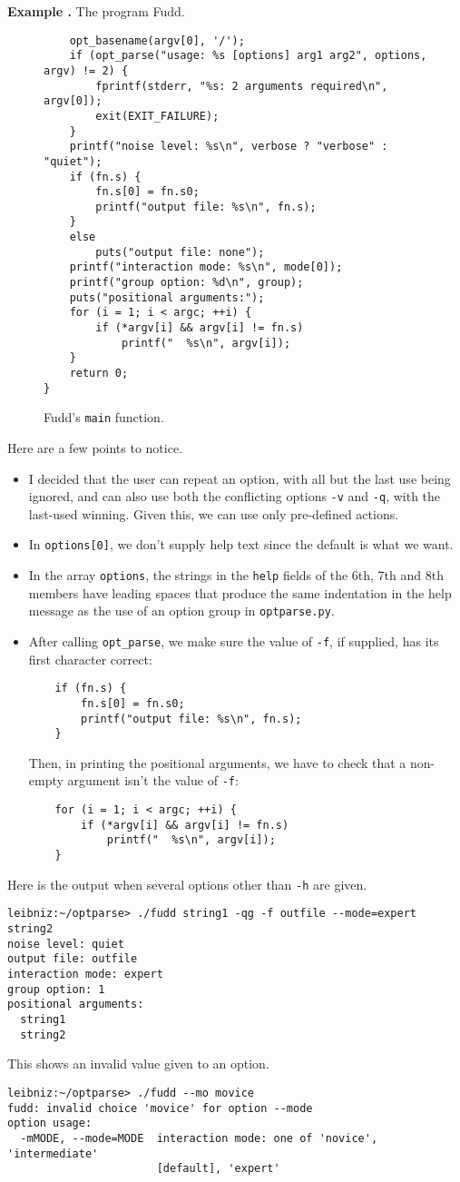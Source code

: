 \documentclass{article}
\newcounter{exnum}
\newenvironment{example}[1]
{\par\smallskip\noindent\refstepcounter{exnum}\textbf{Example
    \theexnum.} The program #1.\par\nopagebreak}
{\par\smallskip}
\renewcommand{\tt}{\texttt}
\begin{document}
\begin{example}{Fudd}
\begin{figure}
\begin{verbatim}
    opt_basename(argv[0], '/');
    if (opt_parse("usage: %s [options] arg1 arg2", options, argv) != 2) {
        fprintf(stderr, "%s: 2 arguments required\n", argv[0]);
        exit(EXIT_FAILURE);
    }
    printf("noise level: %s\n", verbose ? "verbose" : "quiet");
    if (fn.s) {
        fn.s[0] = fn.s0;
        printf("output file: %s\n", fn.s);
    }
    else
        puts("output file: none");
    printf("interaction mode: %s\n", mode[0]);
    printf("group option: %d\n", group);
    puts("positional arguments:");
    for (i = 1; i < argc; ++i) {
        if (*argv[i] && argv[i] != fn.s)
            printf("  %s\n", argv[i]);
    }
    return 0;
}
\end{verbatim}
    \caption{Fudd's \tt{main} function.}
    \label{fig:fudd-main}
  \end{figure}
  Here are a few points to notice.
  \begin{itemize}
  \item I decided that the user can repeat an option, with all but the
    last use being ignored, and can also use both the conflicting
    options \tt{-v} and \tt{-q}, with the last-used winning. Given
    this, we can use only pre-defined actions.
  \item In \tt{options[0]}, we don't supply help text since the
    default is what we want.
  \item In the array \tt{options}, the strings in the \tt{help} fields
    of the 6th, 7th and 8th members have leading spaces that produce
    the same indentation in the help message as the use of an option
    group in \tt{optparse.py}.
  \item After calling \tt{opt\_parse}, we make sure the value of
    \tt{-f}, if supplied, has its first character correct:
{\small
\begin{verbatim}
    if (fn.s) {
        fn.s[0] = fn.s0;
        printf("output file: %s\n", fn.s);
    }
\end{verbatim}}
    Then, in printing the positional arguments, we have to check that
    a non-empty argument isn't the value of \tt{-f}:
{\small
\begin{verbatim}
    for (i = 1; i < argc; ++i) {
        if (*argv[i] && argv[i] != fn.s)
            printf("  %s\n", argv[i]);
    }
\end{verbatim}}
  \end{itemize}
Here is the output when several options other than \tt{-h}
are given.
{\small
\begin{verbatim}
leibniz:~/optparse> ./fudd string1 -qg -f outfile --mode=expert string2
noise level: quiet
output file: outfile
interaction mode: expert
group option: 1
positional arguments:
  string1
  string2
\end{verbatim}}
\noindent This shows an invalid value given to an option.
{\small
\begin{verbatim}
leibniz:~/optparse> ./fudd --mo movice
fudd: invalid choice 'movice' for option --mode
option usage:
  -mMODE, --mode=MODE  interaction mode: one of 'novice', 'intermediate'
                       [default], 'expert'
\end{verbatim}}
\end{example}
\end{document}
